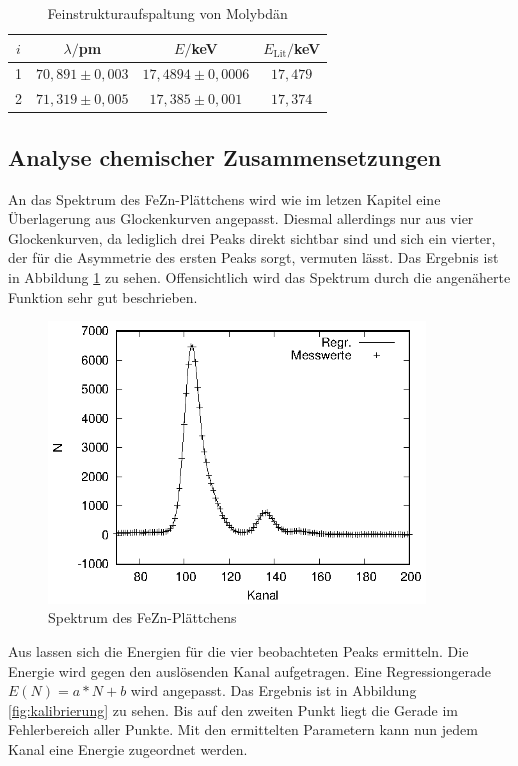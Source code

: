\begin{table}[h]
  \centering
  \caption{Feinstrukturaufspaltung von Molybdän}
  \label{tab:nachtmessung}
  \begin{tabular}{c c c c}
    \toprule
    $i$ & $\lambda/$pm & $E/$keV & $E_\mathrm{Lit}/$keV\\
    \midrule
    1   & $70,891 \pm 0,003$ & $17,4894 \pm 0,0006$  & $17,479$\\
    2   & $71,319 \pm 0,005$ & $17,385 \pm 0,001$ &  $17,374$\\
    \bottomrule
  \end{tabular}
\end{table}

\subsection{Analyse chemischer Zusammensetzungen}
An das Spektrum des FeZn-Plättchens wird wie im letzen Kapitel eine Überlagerung aus Glockenkurven angepasst. Diesmal allerdings nur aus vier Glockenkurven, da lediglich drei Peaks direkt sichtbar sind und sich ein vierter, der für die Asymmetrie des ersten Peaks sorgt, vermuten lässt. Das Ergebnis ist in Abbildung \ref{fig:fezn} zu sehen. Offensichtlich wird das Spektrum durch die angenäherte Funktion sehr gut beschrieben. 

\begin{figure}[h]
  \centering
  \includegraphics[width=10cm]{data/Massenanteil/fezn.eps}
  \caption{Spektrum des FeZn-Plättchens}
  \label{fig:fezn}
\end{figure}

Aus \cite{booklet} lassen sich die Energien für die vier beobachteten Peaks ermitteln. Die Energie wird gegen den auslösenden Kanal aufgetragen. Eine Regressiongerade $E(N)=a*N+b$ wird angepasst. Das Ergebnis ist in Abbildung \ref{fig:kalibrierung} zu sehen. Bis auf den zweiten Punkt liegt die Gerade im Fehlerbereich aller Punkte. Mit den ermittelten Parametern kann nun jedem Kanal eine Energie zugeordnet werden.

